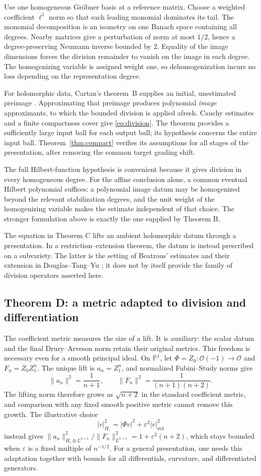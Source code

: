 \documentclass[11pt,reqno]{amsart}
\theoremstyle{remark}
\newcommand{\PP}{\mathbb P}
\newcommand{\cO}{\mathcal O}
\newcommand{\eps}{\varepsilon}
\begin{document}
Use one homogeneous Gr\"obner basis at a reference matrix.
Choose a weighted coefficient $\ell^1$ norm so that each leading
monomial dominates its tail. The monomial decomposition is an
isometry on one Banach space containing all degrees. Nearby matrices
give a perturbation of norm at most $1/2$, hence a degree-preserving
Neumann inverse bounded by $2$. Equality of the image dimensions
forces the division remainder to vanish on the image in each degree.
The homogenizing variable is assigned weight one, so dehomogenization
incurs no loss depending on the representation degree.

For holomorphic data, Cartan's theorem~B supplies an initial,
unestimated preimage \cite{GrauertRemmert}. Approximating that preimage
produces polynomial \emph{image} approximants, to which the bounded
division is applied afresh. Cauchy estimates and a finite compactness
cover give \eqref{eq:division}. The theorem provides a sufficiently
large input ball for each output ball; its hypothesis concerns the
entire input ball. Theorem~\ref{thm:compact} verifies its assumptions
for all stages of the presentation, after removing the common
target grading shift.


The full Hilbert-function hypothesis is convenient because it gives
division in every homogeneous degree. For the affine conclusion
alone, a common eventual Hilbert polynomial suffices: a polynomial
image datum may be homogenized beyond the relevant stabilization
degrees, and the unit weight of the homogenizing variable makes the
estimate independent of that choice. The stronger formulation above
is exactly the one supplied by Theorem B.


The equation in Theorem C lifts an ambient holomorphic datum through
a presentation. In a restriction--extension theorem, the datum is
instead prescribed on a subvariety. The latter is the setting of
Beatrous' estimates \cite{Beatrous} and their extension in Douglas--Tang--Yu
\cite[Theorem~4.3]{DouglasTangYu}; it does not by itself provide
the family of division operators asserted here.

\subsection{Theorem D: a metric adapted to division and differentiation}
The coefficient metric measures the size of a lift. It is auxiliary:
the scalar datum and the final Drury--Arveson norm retain their
original metrics. This freedom is necessary even for a smooth
principal ideal. On $\PP^1$, let
$\Phi=Z_0:\cO(-1)\to\cO$ and $F_n=Z_0Z_1^n$.
The unique lift is $a_n=Z_1^n$, and normalized Fubini--Study norms give
\[
 \|a_n\|^2=\frac{1}{n+1},\qquad
 \|F_n\|^2=\frac{1}{(n+1)(n+2)}.
\]
The lifting norm therefore grows as $\sqrt{n+2}$ in the standard
coefficient metric, and comparison with any fixed smooth positive
metric cannot remove this growth. The illustrative choice
\[
|v|_{H_\eps}^2=|\Phi v|^2+\eps^2|v|_{\mathrm{std}}^2
\]
instead gives
$\|a_n\|_{H_\eps\otimes L^{n+1}}^2/\|F_n\|_{L^{n+1}}^2
=1+\eps^2(n+2)$, which stays bounded when $\eps$ is a fixed
multiple of $n^{-1/2}$. For a general presentation, one needs this
adaptation together with bounds for all differentials, curvature,
and differentiated generators.
\end{document}
